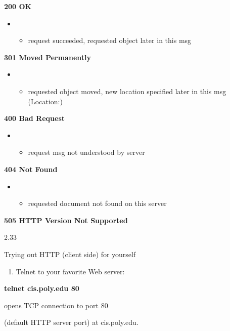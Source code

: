 \documentclass[
]{article}
\begin{document}
\textbf{200 OK}

\begin{itemize}
\item
  \begin{itemize}
  \item
    request succeeded, requested object later in this msg
  \end{itemize}
\end{itemize}

\textbf{301 Moved Permanently}

\begin{itemize}
\item
  \begin{itemize}
  \item
    requested object moved, new location specified later in this msg
    (Location:)
  \end{itemize}
\end{itemize}

\textbf{400 Bad Request}

\begin{itemize}
\item
  \begin{itemize}
  \item
    request msg not understood by server
  \end{itemize}
\end{itemize}

\textbf{404 Not Found}

\begin{itemize}
\item
  \begin{itemize}
  \item
    requested document not found on this server
  \end{itemize}
\end{itemize}

\textbf{505 HTTP Version Not Supported}

2.33

Trying out HTTP (client side) for yourself

\begin{enumerate}
\def\labelenumi{\arabic{enumi}.}
\item
  Telnet to your favorite Web server:
\end{enumerate}

\textbf{telnet cis.poly.edu 80}

opens TCP connection to port 80

(default HTTP server port) at cis.poly.edu.
\end{document}
